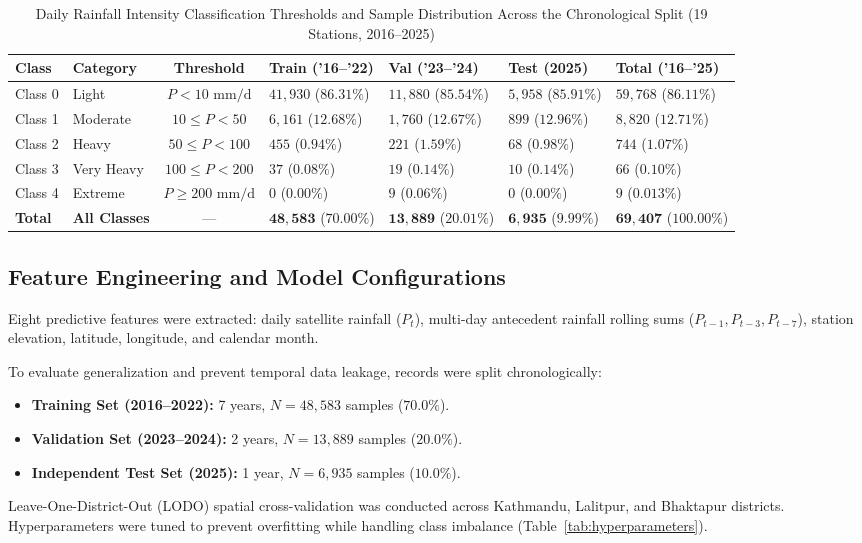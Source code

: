 \documentclass[conference]{IEEEtran}
\begin{document}
\begin{table}[!tbp]
\centering
\caption{Daily Rainfall Intensity Classification Thresholds and Sample Distribution Across the Chronological Split (19 Stations, 2016--2025)}
\label{tab:intensity_classes}
\vspace{3pt}
{\footnotesize
\renewcommand{\arraystretch}{1.18}\setlength{\tabcolsep}{4.0pt}%
\begin{tabularx}{\textwidth}{|l|l|c|Y|Y|Y|Y|}
\hline
\textbf{Class} & \textbf{Category} & \textbf{Threshold} & \textbf{Train ('16--'22)} & \textbf{Val ('23--'24)} & \textbf{Test (2025)} & \textbf{Total ('16--'25)} \\
\hline
Class 0 & Light & $P < 10\text{ mm/d}$ & $41{,}930$ ($86.31\%$) & $11{,}880$ ($85.54\%$) & $5{,}958$ ($85.91\%$) & $59{,}768$ ($86.11\%$) \\ \hline
Class 1 & Moderate & $10 \le P < 50$ & $6{,}161$ ($12.68\%$) & $1{,}760$ ($12.67\%$) & $899$ ($12.96\%$) & $8{,}820$ ($12.71\%$) \\ \hline
Class 2 & Heavy & $50 \le P < 100$ & $455$ ($0.94\%$) & $221$ ($1.59\%$) & $68$ ($0.98\%$) & $744$ ($1.07\%$) \\ \hline
Class 3 & Very Heavy & $100 \le P < 200$ & $37$ ($0.08\%$) & $19$ ($0.14\%$) & $10$ ($0.14\%$) & $66$ ($0.10\%$) \\ \hline
Class 4 & Extreme & $P \ge 200\text{ mm/d}$ & $0$ ($0.00\%$) & $9$ ($0.06\%$) & $0$ ($0.00\%$) & $9$ ($0.013\%$) \\ \hline
\textbf{Total} & \textbf{All Classes} & --- & $\mathbf{48{,}583}$ ($\mathbf{70.00\%}$) & $\mathbf{13{,}889}$ ($\mathbf{20.01\%}$) & $\mathbf{6{,}935}$ ($\mathbf{9.99\%}$) & $\mathbf{69{,}407}$ ($\mathbf{100.00\%}$) \\
\hline
\end{tabularx}%
}
\end{table}

\subsection{Feature Engineering and Model Configurations}
Eight predictive features were extracted: daily satellite rainfall ($P_t$), multi-day antecedent rainfall rolling sums ($P_{t-1}, P_{t-3}, P_{t-7}$), station elevation, latitude, longitude, and calendar month.

To evaluate generalization and prevent temporal data leakage, records were split chronologically:
\begin{itemize}
    \item \textbf{Training Set (2016--2022):} 7 years, $N = 48{,}583$ samples ($70.0\%$).
    \item \textbf{Validation Set (2023--2024):} 2 years, $N = 13{,}889$ samples ($20.0\%$).
    \item \textbf{Independent Test Set (2025):} 1 year, $N = 6{,}935$ samples ($10.0\%$).
\end{itemize}
Leave-One-District-Out (LODO) spatial cross-validation was conducted across Kathmandu, Lalitpur, and Bhaktapur districts. Hyperparameters were tuned to prevent overfitting while handling class imbalance (Table~\ref{tab:hyperparameters}).
\end{document}

